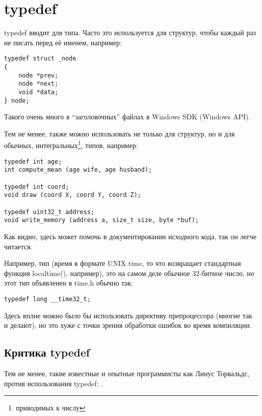 ﻿\section{typedef}

typedef вводит  для типа. Часто это используется для структур, чтобы каждый раз не писать 
перед её именем, например:

\begin{lstlisting}
typedef struct _node
{
	node *prev;
	node *next;
	void *data;
} node;
\end{lstlisting}

Такого очень много в ``заголовочных'' файлах в Windows SDK (Windows API).

Тем не менее,  также можно использовать не только для структур, но и для обычных, 
интегральных\footnote{приводимых к числу}, типов, например:

\begin{lstlisting}
typedef int age;
int compute_mean (age wife, age husband);

typedef int coord;
void draw (coord X, coord Y, coord Z);

typedef uint32_t address;
void write_memory (address a, size_t size, byte *buf);
\end{lstlisting}

Как видно,  здесь может помочь в документировании исходного кода, так он легче читается.

Например, тип  (время в формате UNIX time, то что возвращает стандартная функция localtime(), 
например), это на самом деле
обычное 32-битное число, но этот тип объявленен в time.h обычно так:

\begin{lstlisting}
typedef long __time32_t;
\end{lstlisting}

Здесь вплне можно было бы использовать директиву препроцессора  (многие так и делают),
но это хуже с точки зрения обработки ошибок во время компиляции.

\subsection{Критика typedef}

Тем не менее, такие известные и опытные программисты как Линус Торвальдс, против использования typedef:
\cite{Torvalds:2002}.

